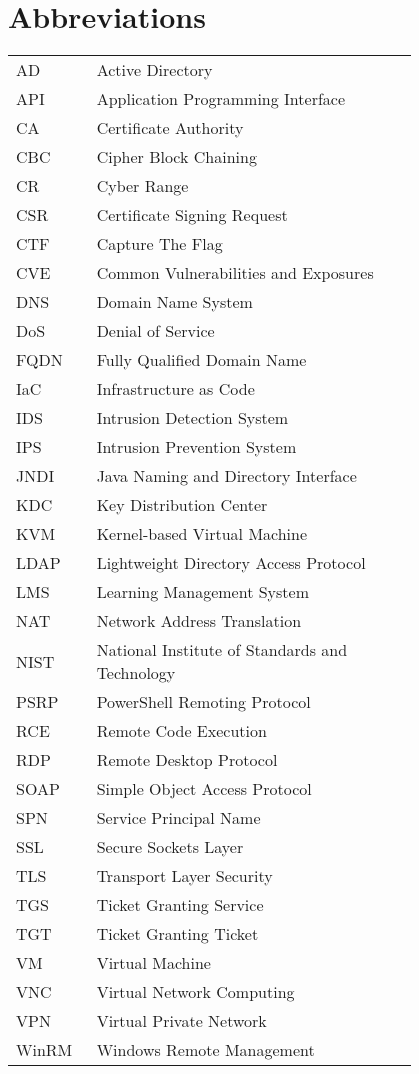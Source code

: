 \chapter*{Abbreviations}

\begin{flushleft}
\begin{tabular}{l p{0.8\linewidth}}
AD       & Active Directory\\
API      & Application Programming Interface\\
CA       & Certificate Authority\\
CBC      & Cipher Block Chaining\\
CR       & Cyber Range\\
CSR      & Certificate Signing Request\\
CTF      & Capture The Flag\\
CVE      & Common Vulnerabilities and Exposures\\
DNS      & Domain Name System\\
DoS      & Denial of Service\\
FQDN     & Fully Qualified Domain Name\\
IaC      & Infrastructure as Code\\
IDS      & Intrusion Detection System\\
IPS      & Intrusion Prevention System\\
JNDI     & Java Naming and Directory Interface\\
KDC      & Key Distribution Center\\
KVM      & Kernel-based Virtual Machine\\
LDAP     & Lightweight Directory Access Protocol\\
LMS      & Learning Management System\\
NAT      & Network Address Translation\\
NIST     & National Institute of Standards and Technology\\
PSRP     & PowerShell Remoting Protocol\\
RCE      & Remote Code Execution\\
RDP      & Remote Desktop Protocol\\
SOAP     & Simple Object Access Protocol\\
SPN      & Service Principal Name\\
SSL      & Secure Sockets Layer\\
TLS      & Transport Layer Security\\
TGS      & Ticket Granting Service\\
TGT      & Ticket Granting Ticket\\
VM       & Virtual Machine\\
VNC      & Virtual Network Computing\\
VPN      & Virtual Private Network\\
WinRM    & Windows Remote Management\\
\end{tabular}
\end{flushleft}